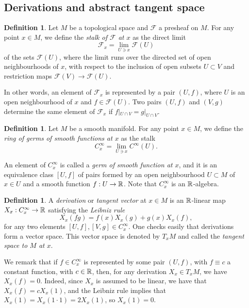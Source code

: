 \documentclass[11pt,a4paper]{book}
\theoremstyle{remark} \newtheorem{rmk}[thm]{Remark}
\theoremstyle{definition} \newtheorem{defn}[thm]{Definition}
\theoremstyle{definition} \newtheorem{ex}[thm]{Example}
\theoremstyle{definition} \newtheorem{ej}[thm]{Exercise}
\begin{document}
\subsection{Derivations and abstract tangent space}
\begin{defn}
  Let $M$ be a topological space and $\mathscr{F}$ a presheaf on $M$. For any point $x\in M$, we define the \emph{stalk of $\mathscr{F}$ at $x$} as the direct limit
\begin{equation*}
\mathscr{F}_x = \lim_{U\ni x} \mathscr{F}(U)
\end{equation*}
of the sets $\mathscr{F}(U)$, where the limit runs over the directed set of open neighbourhoods of $x$, with respect to the inclusion of open subsets $U\subset V$ and restriction maps $\mathscr{F}(V)\rightarrow \mathscr{F}(U)$.
\end{defn}
In other words, an element of $\mathscr{F}_x$ is represented by a pair $(U,f)$, where $U$ is an open neighbourhood of $x$ and $f\in \mathscr{F}(U)$. Two pairs $(U,f)$ and $(V,g)$ determine the same element of $\mathscr{F}_x$ if $f|_{U\cap V}=g|_{U \cap V}$.

\begin{defn}
Let $M$ be a smooth manifold. For any point $x\in M$, we define the \emph{ring of germs of smooth functions at $x$} as the stalk
\begin{equation*}
C^\infty_x = \lim_{U\ni x} C^\infty(U).
\end{equation*}
\end{defn}

An element of $C^\infty_x$ is called a \emph{germ of smooth function at $x$}, and it is an equivalence class $[U,f]$ of pairs formed by an open neighbourhood $U\subset M$ of $x\in U$ and a smooth function $f:U\rightarrow \mathbb R$. Note that $C^\infty_x$ is an $\mathbb R$-algebra.

\begin{defn}
  A \emph{derivation} or \emph{tangent vector} at $x\in M$ is an $\mathbb R$-linear map $X_x:C^\infty_x\rightarrow \mathbb R$ satisfying the \emph{Leibniz rule}
  \begin{equation*}
X_x(fg)= f(x) X_x(g) + g(x) X_x(f),
  \end{equation*}
  for any two elements $[U,f], [V,g]\in C^\infty_x$. One checks easily that derivations form a vector space. This vector space is denoted by $T_xM$ and called the \emph{tangent space to $M$ at $x$}.

\end{defn}

We remark that if $f\in C^\infty_x$ is represented by some pair $(U,f)$, with $f\equiv c$ a constant function, with $c\in \mathbb R$, then, for any derivation $X_x\in T_xM$, we have $X_x(f)=0$. Indeed, since $X_x$ is assumed to be linear, we have that $X_x(f)=cX_x(1)$, and the Leibniz rule implies that $X_x(1)=X_x(1\cdot 1)=2X_x(1)$, so $X_x(1)=0$.
\end{document}
